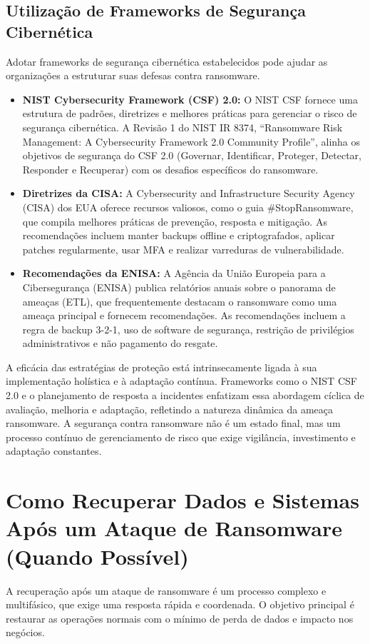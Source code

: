 \subsection{Utilização de Frameworks de Segurança Cibernética}
Adotar frameworks de segurança cibernética estabelecidos pode ajudar as organizações a estruturar suas defesas contra ransomware.
\begin{itemize}
    \item \textbf{NIST Cybersecurity Framework (CSF) 2.0:} O NIST CSF fornece uma estrutura de padrões, diretrizes e melhores práticas para gerenciar o risco de segurança cibernética. A Revisão 1 do NIST IR 8374, ``Ransomware Risk Management: A Cybersecurity Framework 2.0 Community Profile'', alinha os objetivos de segurança do CSF 2.0 (Governar, Identificar, Proteger, Detectar, Responder e Recuperar) com os desafios específicos do ransomware.
    \item \textbf{Diretrizes da CISA:} A Cybersecurity and Infrastructure Security Agency (CISA) dos EUA oferece recursos valiosos, como o guia \#StopRansomware, que compila melhores práticas de prevenção, resposta e mitigação. As recomendações incluem manter backups offline e criptografados, aplicar patches regularmente, usar MFA e realizar varreduras de vulnerabilidade.
    \item \textbf{Recomendações da ENISA:} A Agência da União Europeia para a Cibersegurança (ENISA) publica relatórios anuais sobre o panorama de ameaças (ETL), que frequentemente destacam o ransomware como uma ameaça principal e fornecem recomendações. As recomendações incluem a regra de backup 3-2-1, uso de software de segurança, restrição de privilégios administrativos e não pagamento do resgate.
\end{itemize}

A eficácia das estratégias de proteção está intrinsecamente ligada à sua implementação holística e à adaptação contínua. Frameworks como o NIST CSF 2.0 e o planejamento de resposta a incidentes enfatizam essa abordagem cíclica de avaliação, melhoria e adaptação, refletindo a natureza dinâmica da ameaça ransomware. A segurança contra ransomware não é um estado final, mas um processo contínuo de gerenciamento de risco que exige vigilância, investimento e adaptação constantes.

\section{Como Recuperar Dados e Sistemas Após um Ataque de Ransomware (Quando Possível)}
A recuperação após um ataque de ransomware é um processo complexo e multifásico, que exige uma resposta rápida e coordenada. O objetivo principal é restaurar as operações normais com o mínimo de perda de dados e impacto nos negócios.

